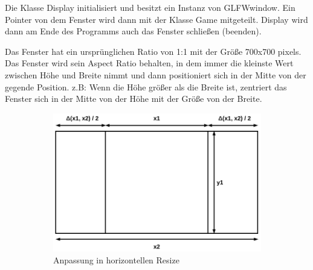 \documentclass[doktyp=studarbeit]{TUBAFarbeiten}
\begin{document}
Die Klasse Display initialisiert und besitzt ein Instanz von GLFWwindow. 
Ein Pointer von dem Fenster wird dann mit der Klasse Game mitgeteilt. 
Display wird dann am Ende des Programms auch das Fenster schließen (beenden).

Das Fenster hat ein ursprünglichen Ratio von 1:1 mit der Größe 700x700 pixels.
Das Fenster wird sein Aspect Ratio behalten, in dem immer die kleinste Wert 
zwischen Höhe und Breite nimmt und dann positioniert sich in der Mitte von der 
gegende Position. z.B: Wenn die Höhe größer als die Breite ist, zentriert das 
Fenster sich in der Mitte von der Höhe mit der Größe von der Breite. 

\begin{figure}[!htb]
    \centering
    \begin{subfigure}[b]{0.55\textwidth}
        \centering
        \includegraphics[width=1\linewidth]{display-2.png}
        \caption{Anpassung in horizontellen Resize}
    \end{subfigure}
    \begin{subfigure}[b]{0.4\textwidth}
        \centering

\end{subfigure}
\end{figure}
\end{document}
